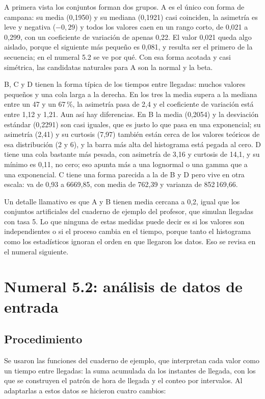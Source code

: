 \documentclass[11pt,letterpaper]{article}
\begin{document}
A primera vista los conjuntos forman dos grupos. A es el único con forma de campana: su media (0,1950) y su mediana
(0,1921) casi coinciden, la asimetría es leve y negativa ($-0{,}29$) y todos los valores caen en un rango corto,
de 0,021 a 0,299, con un coeficiente de variación de apenas 0,22. El valor 0,021 queda algo aislado, porque el
siguiente más pequeño es 0,081, y resulta ser el primero de la secuencia; en el numeral 5.2 se ve por qué. Con esa
forma acotada y casi simétrica, las candidatas naturales para A son la normal y la beta.

B, C y D tienen la forma típica de los tiempos entre llegadas: muchos valores pequeños y una cola larga a la
derecha. En los tres la media supera a la mediana entre un 47 y un 67\,\%, la asimetría pasa de 2,4 y el
coeficiente de variación está entre 1,12 y 1,21. Aun así hay diferencias. En B la media (0,2054) y la desviación
estándar (0,2291) son casi iguales, que es justo lo que pasa en una exponencial; su asimetría (2,41) y su curtosis
(7,97) también están cerca de los valores teóricos de esa distribución (2 y 6), y la barra más alta del histograma
está pegada al cero. D tiene una cola bastante más pesada, con asimetría de 3,16 y curtosis de 14,1, y su mínimo es
0,11, no cero; eso apunta más a una lognormal o una gamma que a una exponencial. C tiene una forma parecida a la de B
y D pero vive en otra escala: va de 0,93 a 6669,85, con media de 762,39 y varianza de 852\,169,66.

Un detalle llamativo es que A y B tienen media cercana a 0,2, igual que los conjuntos artificiales del cuaderno de
ejemplo del profesor, que simulan llegadas con tasa 5. Lo que ninguna de estas medidas puede decir es si los valores
son independientes o si el proceso cambia en el tiempo, porque tanto el histograma como los estadísticos ignoran el
orden en que llegaron los datos. Eso se revisa en el numeral siguiente.

\section{Numeral 5.2: análisis de datos de entrada}

\subsection{Procedimiento}

Se usaron las funciones del cuaderno de ejemplo, que interpretan cada valor como un tiempo entre llegadas: la suma
acumulada da los instantes de llegada, con los que se construyen el patrón de hora de llegada y el conteo por
intervalos. Al adaptarlas a estos datos se hicieron cuatro cambios:
\end{document}
